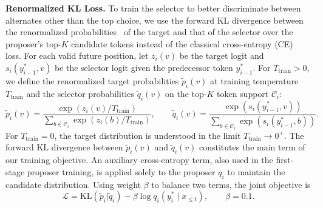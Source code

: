 \noindent\textbf{Renormalized KL Loss.} To train the selector to better discriminate between alternates other than the top choice, we use the forward KL divergence between the renormalized probabilities~\citep{zhu2026many} of the target and that of the selector over the proposer's top-$K$ candidate tokens instead of the classical cross-entropy (CE) loss. For each valid future position, let $z_i(v)$ be the target logit and $s_i(y_{i-1}^{*},v)$ be the selector logit given the predecessor token $y_{i-1}^{*}$. For $T_{\mathrm{train}}>0$, we define the renormalized target probabilities $\widetilde p_i(v)$ at training temperature $T_{\mathrm{train}}$ and the selector probabilities $\widetilde q_i(v)$ on the top-$K$ token support $\mathcal C_i$:
\begin{equation}
\widetilde p_i(v)
=\frac{\exp(z_i(v)/T_{\mathrm{train}})}
{\sum_{b\in\mathcal C_i}\exp(z_i(b)/T_{\mathrm{train}})},
\qquad
\widetilde q_i(v)
=\frac{\exp(s_i(y_{i-1}^{*},v))}
{\sum_{b\in\mathcal C_i}\exp(s_i(y_{i-1}^{*},b))}.
\label{eq:ubtree-training-distributions}
\end{equation}
For $T_{\mathrm{train}}=0$, the target distribution is understood in the limit $T_{\mathrm{train}}\to0^+$.
The forward KL divergence between $\widetilde p_i(v)$ and $\widetilde q_i(v)$ constitutes the main term of our training objective. An auxiliary cross-entropy term, also used in the first-stage proposer training, is applied solely to the proposer $q_i$ to maintain the candidate distribution. Using weight $\beta$ to balance two terms, the joint objective is
\begin{equation}
\mathcal L
=
\mathrm{KL}(\widetilde p_i|\widetilde q_i)
-\beta\log q_i(y_i^{*}\mid x_{\le t}),
\qquad \beta=0.1.
\label{eq:ubtree-training-loss}
\end{equation}



